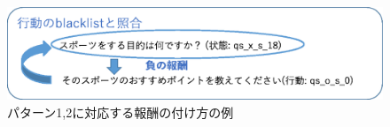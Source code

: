 \documentclass[12pt,a4paper,twoside,openany]{jbook}
\begin{document}

\begin{figure}[tb]
  \begin{center} %
    \includegraphics[width=12cm]{hosyuimage1_2.eps}
    \caption{パターン1,2に対応する報酬の付け方の例} %
    \label{hosyuimage1} %
  \end{center}
\end{figure}
\end{document}
